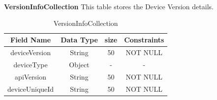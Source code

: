 \textbf{VersionInfoCollection} This table stores the Device Version details.\nolinebreak
\begin{table}[hp]
\centering
\begin{tabular}{|c|c|c|c|}
\hline
\textbf{Field Name}  & \textbf{Data Type}  & \textbf{size} &\textbf{Constraints}  \\
\hline
deviceVersion & String &	50 & NOT NULL \\\hline
deviceType & Object &	- & - \\\hline
apiVersion & String &	50 & NOT NULL \\\hline
deviceUniqueId & String &	50 & NOT NULL \\\hline
  

\end{tabular}
\caption{VersionInfoCollection}
\end{table}



